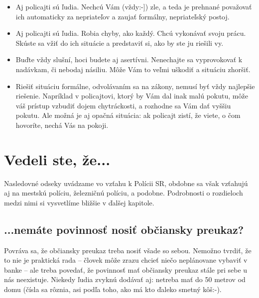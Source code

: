 \documentclass[openany]{book}
\begin{document}
\begin{itemize}
\item Aj policajti sú ľudia. Nechcú Vám  (vždy:-]) zle, a teda je prehnané považovať ich automaticky za nepriateľov a zaujať formálny, nepriateľský postoj. 

\item Aj policajti sú ľudia. Robia chyby, ako každý. Chcú vykonávať svoju prácu. Skúste sa vžiť  do ich situácie a predstaviť si, ako by ste ju riešili vy.
 
\item Buďte vždy slušní, hoci budete aj asertívni. Nenechajte sa vyprovokovať k nadávkam, či nebodaj násiliu. Môže Vám to veľmi uškodiť a situáciu zhoršiť.

\item Riešiť situáciu formálne, odvolávaním sa na zákony, nemusí byť vždy najlepšie riešenie. Napríklad v policajtovi, ktorý by Vám  dal inak malú pokutu, môže váš prístup vzbudiť dojem chytráckosti, a rozhodne sa Vám dať vyššiu pokutu. Ale možná je aj opačná situácia: ak policajt zistí, že viete, o čom hovoríte, nechá Vás na pokoji.
\end{itemize}

\chapter{Vedeli ste, že...}

Nasledovné odseky uvádzame vo vzťahu k Polícii SR, obdobne sa však vzťahujú aj na mestskú políciu, železničnú políciu, a podobne. Podrobnosti o rozdieloch medzi nimi si vysvetlíme bližšie v ďalšej kapitole.

\section*{...nemáte povinnosť nosiť občiansky preukaz?}

Povráva sa, že občiansky preukaz treba nosiť všade so sebou. Nemožno tvrdiť, že to nie je praktická rada -- človek môže zrazu chcieť niečo neplánovane vybaviť v banke -- ale treba povedať, že povinnosť mať občiansky preukaz stále pri sebe u nás neexistuje. Niekedy ľudia zvyknú dodávať aj: netreba mať do 50 metrov od domu (čísla sa rôznia, asi podľa toho, ako má kto ďaleko smetný kôš:-).
\end{document}
